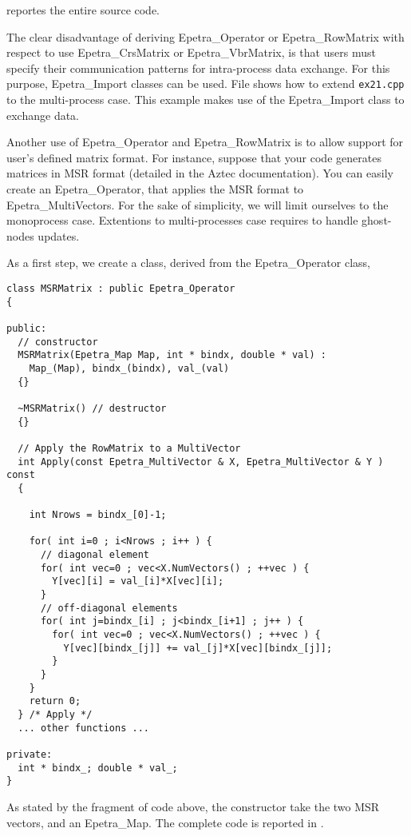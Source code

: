  reportes the entire source code.

\begin{remark}
  The clear disadvantage of deriving Epetra\_Operator or
  Epetra\_RowMatrix with respect to use Epetra\_CrsMatrix or
  Epetra\_VbrMatrix, is that users must specify their communication
  patterns for intra-process data exchange. For this purpose,
  Epetra\_Import classes can be used.  File 
  shows how to extend \verb!ex21.cpp! to the multi-process case. This
  example makes use of the Epetra\_Import class to exchange data.
\end{remark}


Another use of  Epetra\_Operator and Epetra\_RowMatrix is to allow
support for user's defined matrix format. For instance, suppose that
your code generates matrices in MSR format (detailed in the Aztec
documentation). You can easily create an Epetra\_Operator, that applies
the MSR format to Epetra\_MultiVectors. For the sake of simplicity, we
will limit ourselves to the monoprocess case. Extentions to
multi-processes case requires to handle ghost-nodes updates.

As a first step, we create a class, derived from the Epetra\_Operator
class,
\begin{verbatim}
class MSRMatrix : public Epetra_Operator 
{

public:
  // constructor
  MSRMatrix(Epetra_Map Map, int * bindx, double * val) :
    Map_(Map), bindx_(bindx), val_(val) 
  {}

  ~MSRMatrix() // destructor
  {}

  // Apply the RowMatrix to a MultiVector
  int Apply(const Epetra_MultiVector & X, Epetra_MultiVector & Y ) const 
  {

    int Nrows = bindx_[0]-1;
    
    for( int i=0 ; i<Nrows ; i++ ) {
      // diagonal element
      for( int vec=0 ; vec<X.NumVectors() ; ++vec ) {
        Y[vec][i] = val_[i]*X[vec][i];
      }
      // off-diagonal elements
      for( int j=bindx_[i] ; j<bindx_[i+1] ; j++ ) {
        for( int vec=0 ; vec<X.NumVectors() ; ++vec ) {
          Y[vec][bindx_[j]] += val_[j]*X[vec][bindx_[j]];
        }
      }
    }
    return 0;
  } /* Apply */
  ... other functions ...

private:
  int * bindx_; double * val_;
}
\end{verbatim}
As stated by the fragment of code above, the constructor take the two
MSR vectors, and an Epetra\_Map. The complete code is reported in
\newline
{}.

